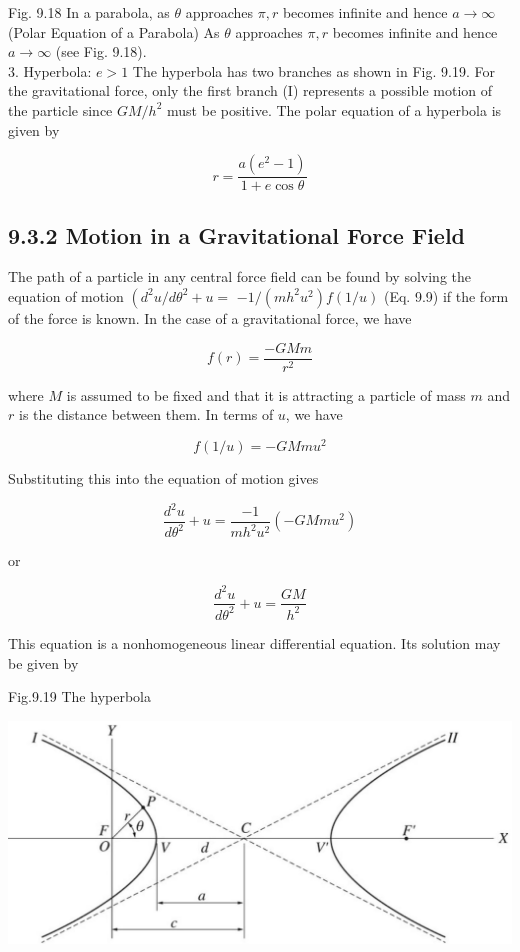 \documentclass[10pt]{article}
\begin{document}
Fig. 9.18 In a parabola, as $\theta$ approaches $\pi, r$ becomes infinite and hence $a \rightarrow \infty$\\
(Polar Equation of a Parabola) As $\theta$ approaches $\pi, r$ becomes infinite and hence $a \rightarrow \infty$ (see Fig. 9.18).\\
3. Hyperbola: $e>1$ The hyperbola has two branches as shown in Fig. 9.19. For the gravitational force, only the first branch (I) represents a possible motion of the particle since $G M / h^{2}$ must be positive. The polar equation of a hyperbola is given by

$$
r=\frac{a\left(e^{2}-1\right)}{1+e \cos \theta}
$$

\subsection*{9.3.2 Motion in a Gravitational Force Field}
The path of a particle in any central force field can be found by solving the equation of motion $\left(d^{2} u / d \theta^{2}+u=\right.$ $-1 /\left(m h^{2} u^{2}\right) f(1 / u)$ (Eq. 9.9) if the form of the force is known. In the case of a gravitational force, we have

$$
f(r)=\frac{-G M m}{r^{2}}
$$

where $M$ is assumed to be fixed and that it is attracting a particle of mass $m$ and $r$ is the distance between them. In terms of $u$, we have

$$
f(1 / u)=-G M m u^{2}
$$

Substituting this into the equation of motion gives

$$
\frac{d^{2} u}{d \theta^{2}}+u=\frac{-1}{m h^{2} u^{2}}\left(-G M m u^{2}\right)
$$

or


\begin{equation*}
\frac{d^{2} u}{d \theta^{2}}+u=\frac{G M}{h^{2}} \tag{9.26}
\end{equation*}


This equation is a nonhomogeneous linear differential equation. Its solution may be given by

Fig.9.19 The hyperbola

\begin{center}
\includegraphics[max width=\textwidth]{2024_09_13_db1f357d2aad0a03eb2eg-154}
\end{center}
\end{document}
